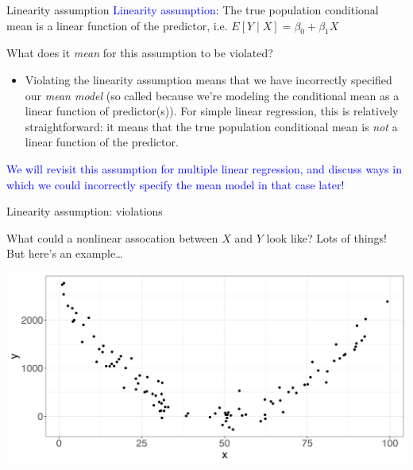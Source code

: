 \documentclass[10pt,t]{beamer}
\begin{document}
\begin{frame}{Linearity assumption}
\textcolor{blue}{Linearity assumption}: The true population conditional mean is a linear function of the predictor, i.e. $E[Y \mid X] = \beta_0 + \beta_1 X$

\vspace{0.3cm}

What does it \textit{mean} for this assumption to be violated?

\vspace{0.3cm}

\begin{itemize}
	\item[] Violating the linearity assumption means that we have incorrectly specified our \textit{mean model} (so called because we're modeling the conditional mean as a linear function of predictor(s)). For simple linear regression, this is relatively straightforward: it means that the true population conditional mean is \textit{not} a linear function of the predictor.
\end{itemize}

\vspace{0.3cm}

 \textcolor{blue}{We will revisit this assumption for multiple linear regression, and discuss ways in which we could incorrectly specify the mean model in that case later!}

\end{frame}

\begin{frame}{Linearity assumption: violations}

What could a nonlinear assocation between $X$ and $Y$ look like? Lots of things! But here's an example\dots

\vspace{0.3cm}

\centering \includegraphics[scale=0.4]{figures/quadratic.png}

\end{frame}
\end{document}
